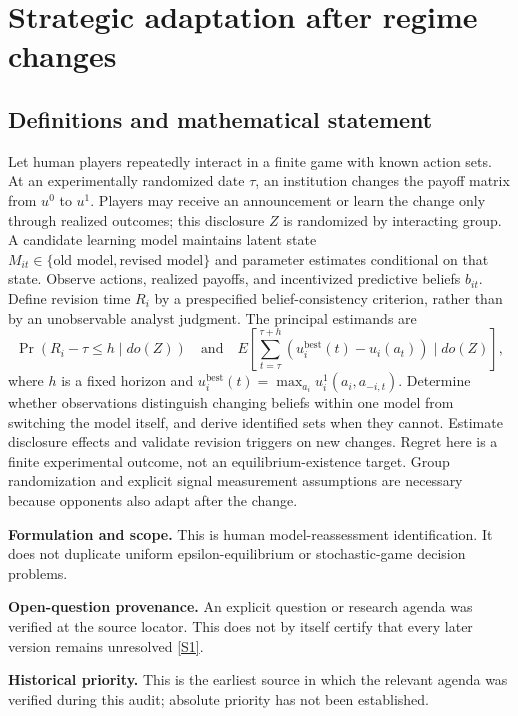 \documentclass[11pt]{article}
\newcommand{\sref}[2]{\hyperlink{source:#1:#2}{[S#2]}}
\begin{document}
\section*{Strategic adaptation after regime changes}\label{30007565}
\subsection{Definitions and mathematical statement}
Let human players repeatedly interact in a finite game with known action sets. At an experimentally randomized date \(\tau\), an institution changes the payoff matrix from \(u^0\) to \(u^1\). Players may receive an announcement or learn the change only through realized outcomes; this disclosure \(Z\) is randomized by interacting group. A candidate learning model maintains latent state \(M_{it}\in\{\text{old model},\text{revised model}\}\) and parameter estimates conditional on that state. Observe actions, realized payoffs, and incentivized predictive beliefs \(b_{it}\). Define revision time \(R_i\) by a prespecified belief-consistency criterion, rather than by an unobservable analyst judgment. The principal estimands are
\[
 \Pr(R_i-\tau\leq h\mid do(Z))
 \quad\text{and}\quad
 E\left[\sum_{t=\tau}^{\tau+h}(u_i^{\mathrm{best}}(t)-u_i(a_t))\mid do(Z)\right],
\]
where \(h\) is a fixed horizon and \(u_i^{\mathrm{best}}(t)=\max_{a_i}u_i^1(a_i,a_{-i,t})\). Determine whether observations distinguish changing beliefs within one model from switching the model itself, and derive identified sets when they cannot. Estimate disclosure effects and validate revision triggers on new changes. Regret here is a finite experimental outcome, not an equilibrium-existence target. Group randomization and explicit signal measurement assumptions are necessary because opponents also adapt after the change.

\par\textbf{Formulation and scope.} This is human model-reassessment identification. It does not duplicate uniform epsilon-equilibrium or stochastic-game decision problems.

\par\textbf{Open-question provenance.} An explicit question or research agenda was verified at the source locator. This does not by itself certify that every later version remains unresolved \sref{30007565}{1}.

\par\textbf{Historical priority.} This is the earliest source in which the relevant agenda was verified during this audit; absolute priority has not been established.
\end{document}
